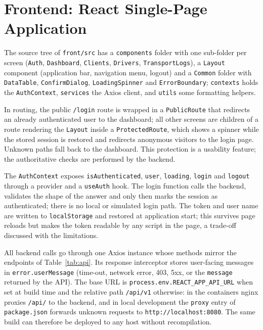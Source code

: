 \section{Frontend: React Single-Page Application}
\label{sec:impl-front}

The source tree of \texttt{front/src} has a \texttt{components} folder with one sub-folder per screen (\texttt{Auth}, \texttt{Dashboard}, \texttt{Clients}, \texttt{Drivers}, \texttt{TransportLogs}), a \texttt{Layout} component (application bar, navigation menu, logout) and a \texttt{Common} folder with \texttt{DataTable}, \texttt{ConfirmDialog}, \texttt{LoadingSpinner} and \texttt{ErrorBoundary}; \texttt{contexts} holds the \texttt{AuthContext}, \texttt{services} the Axios client, and \texttt{utils} some formatting helpers.

In routing, the public \texttt{/login} route is wrapped in a \texttt{PublicRoute} that redirects an already authenticated user to the dashboard; all other screens are children of a route rendering the \texttt{Layout} inside a \texttt{ProtectedRoute}, which shows a spinner while the stored session is restored and redirects anonymous visitors to the login page. Unknown paths fall back to the dashboard. This protection is a usability feature; the authoritative checks are performed by the backend.

The \texttt{AuthContext} exposes \texttt{isAuthenticated}, \texttt{user}, \texttt{loading}, \texttt{login} and \texttt{logout} through a provider and a \texttt{useAuth} hook. The login function calls the backend, validates the shape of the answer and only then marks the session as authenticated; there is no local or simulated login path. The token and user name are written to \texttt{localStorage} and restored at application start; this survives page reloads but makes the token readable by any script in the page, a trade-off discussed with the limitations.

All backend calls go through one Axios instance whose methods mirror the endpoints of Table~\ref{tab:api}. Its response interceptor stores user-facing messages in \texttt{error.userMessage} (time-out, network error, 403, 5xx, or the \texttt{message} returned by the API). The base URL is \texttt{process.env.REACT\_APP\_API\_URL} when set at build time and the relative path \texttt{/api/v1} otherwise: in the containers nginx proxies \texttt{/api/} to the backend, and in local development the \texttt{proxy} entry of \texttt{package.json} forwards unknown requests to \texttt{http://localhost:8080}. The same build can therefore be deployed to any host without recompilation.

